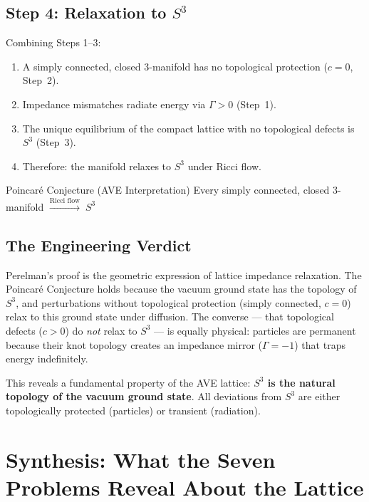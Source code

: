 \subsection{Step 4: Relaxation to $S^3$}

Combining Steps 1--3:
\begin{enumerate}
    \item A simply connected, closed 3-manifold has no topological protection ($c = 0$, Step~2).
    \item Impedance mismatches radiate energy via $\Gamma > 0$ (Step~1).
    \item The unique equilibrium of the compact lattice with no topological defects is $S^3$ (Step~3).
    \item Therefore: the manifold relaxes to $S^3$ under Ricci flow.
\end{enumerate}

\begin{resultbox}{Poincar\'e Conjecture (AVE Interpretation)}
Every simply connected, closed 3-manifold $\xrightarrow{\text{Ricci flow}}\; S^3$
\end{resultbox}

\subsection{The Engineering Verdict}
Perelman's proof is the geometric expression of lattice impedance relaxation. The Poincar\'e Conjecture holds because the vacuum ground state has the topology of $S^3$, and perturbations without topological protection (simply connected, $c = 0$) relax to this ground state under diffusion. The converse --- that topological defects ($c > 0$) do \textit{not} relax to $S^3$ --- is equally physical: particles are permanent because their knot topology creates an impedance mirror ($\Gamma = -1$\gammaundeclared{}) that traps energy indefinitely.

This reveals a fundamental property of the AVE lattice: \textbf{$S^3$ is the natural topology of the vacuum ground state}. All deviations from $S^3$ are either topologically protected (particles) or transient (radiation).

\section{Synthesis: What the Seven Problems Reveal About the Lattice}
\label{sec:millennium_synthesis}

